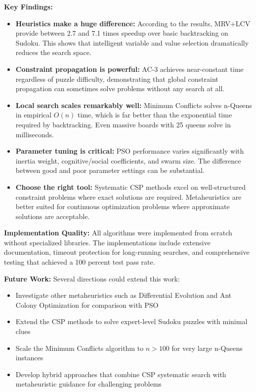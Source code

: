 \documentclass[letterpaper]{article}
\begin{document}
\textbf{Key Findings:}
\begin{itemize}
\item \textbf{Heuristics make a huge difference:} According to the results, MRV+LCV provide between 2.7 and 7.1 times speedup over basic backtracking on Sudoku. This shows that intelligent variable and value selection dramatically reduces the search space.
\item \textbf{Constraint propagation is powerful:} AC-3 achieves near-constant time regardless of puzzle difficulty, demonstrating that global constraint propagation can sometimes solve problems without any search at all.
\item \textbf{Local search scales remarkably well:} Minimum Conflicts solves n-Queens in empirical $O(n)$ time, which is far better than the exponential time required by backtracking. Even massive boards with 25 queens solve in milliseconds.
\item \textbf{Parameter tuning is critical:} PSO performance varies significantly with inertia weight, cognitive/social coefficients, and swarm size. The difference between good and poor parameter settings can be substantial.
\item \textbf{Choose the right tool:} Systematic CSP methods excel on well-structured constraint problems where exact solutions are required. Metaheuristics are better suited for continuous optimization problems where approximate solutions are acceptable.
\end{itemize}

\textbf{Implementation Quality:}
All algorithms were implemented from scratch without specialized libraries. The implementations include extensive documentation, timeout protection for long-running searches, and comprehensive testing that achieved a 100 percent test pass rate.

\textbf{Future Work:}
Several directions could extend this work:
\begin{itemize}
\item Investigate other metaheuristics such as Differential Evolution and Ant Colony Optimization for comparison with PSO
\item Extend the CSP methods to solve expert-level Sudoku puzzles with minimal clues
\item Scale the Minimum Conflicts algorithm to $n > 100$ for very large n-Queens instances
\item Develop hybrid approaches that combine CSP systematic search with metaheuristic guidance for challenging problems
\end{itemize}
\end{document}
